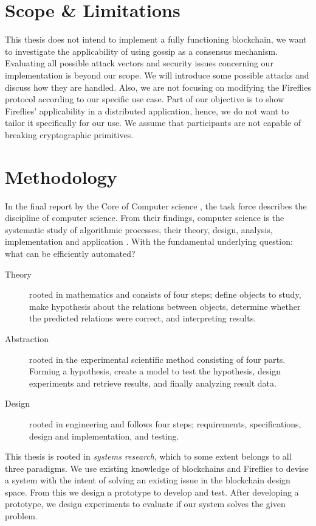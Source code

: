 \documentclass[USenglish]{uit-thesis}
\begin{document}
\section{Scope \& Limitations}
This thesis does not intend to implement a fully functioning blockchain, we want to investigate the applicability of using gossip as a consensus mechanism.
Evaluating all possible attack vectors and security issues concerning our implementation is beyond our scope.
We will introduce some possible attacks and discuss how they are handled. 
Also, we are not focusing on modifying the Fireflies protocol according to our specific use case.
Part of our objective is to show Fireflies' applicability in a distributed application, hence, we do not want to tailor it specifically for our use. 
We assume that participants are not capable of breaking cryptographic primitives.



\section{Methodology}
In the final report by the Core of Computer science \cite{methodology}, the task force describes the discipline of computer science.
From their findings, computer science is the systematic study of algorithmic processes, their theory, design, analysis, implementation and application \cite{methodology}.
With the fundamental underlying question: what can be efficiently automated?
\begin{description}
\item[Theory] rooted in mathematics and consists of four steps; define objects to study, make hypothesis about the relations between objects, determine whether the predicted relations were correct, and interpreting results.  
\item[Abstraction] rooted in the experimental scientific method consisting of four parts. 
Forming a hypothesis, create a model to test the hypothesis, design experiments and retrieve results, and finally analyzing result data.	
\item[Design] rooted in engineering and follows four steps; requirements, specifications, design and implementation, and testing. 
\end{description}
This thesis is rooted in \textit{systems research}, which to some extent belongs to all three paradigms. 
We use existing knowledge of blockchains and Fireflies to devise a system with the intent of solving an existing issue in the blockchain design space. 
From this we design a prototype to develop and test.
After developing a prototype, we design experiments to evaluate if our system solves the given problem.
\end{document}
